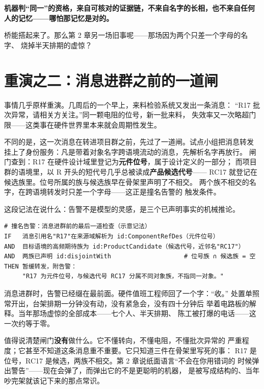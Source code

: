 \textbf{机器判“同一”的资格，来自可核对的证据链，不来自名字的长相，也不来自任何人的记忆——哪怕那记忆是对的。}

桥能搭起来了。那么第 2 章另一场旧事呢——那场因为两个只差一个字母的名字、
烧掉半天排期的虚惊？

\section{重演之二：消息进群之前的一道闸}

事情几乎原样重演。几周后的一个早上，来料检验系统又发出一条消息：
“R17 批次异常，请相关方关注。”同一颗电阻的位号，新一批来料，
失效率又一次略超门限——这类事在硬件世界里本来就会周期性发生。

不同的是，这一次消息在转进项目群之前，先过了一道闸。试点小组把消息转发
挂上了身份服务：凡是带着对象名字跨语境流动的消息，先解析名字再放行。
闸门查到：R17 在硬件设计域里登记为\textbf{元件位号}，属于设计定义的一部分；
而项目群的语境里，以 R 开头的短代号几乎总被读成\textbf{产品候选代号}——
RC17 就登记在候选族里。位号所属的族与候选族早在骨架里声明了不相交。
两个族不相交的名字，在跨语境转发时只差一个字母——这正是撞名告警的
触发条件。

这段记法在说什么：告警不是模型的灵感，是三个已声明事实的机械推论。

\nopagebreak[4]
\begin{codebox}
\begin{Verbatim}[fontsize=\small,breaklines=true,breakanywhere=true,breaksymbolleft={},breaksymbolright={}]
# 撞名告警：消息进群前的最后一道检查（示意记法）
IF   消息引用名"R17"在来源域解析为 id:ComponentRefDes（元件位号）
AND  目标语境的高频期待族为 id:ProductCandidate（候选代号，近邻名"RC17"）
AND  两族已声明 id:disjointWith                    # 位号族 ∩ 候选族 = 空
THEN 暂缓转发，附告警：
     "R17 为元件位号，与候选代号 RC17 分属不同对象族，不指同一对象。"
\end{Verbatim}
\end{codebox}

消息进群时，告警已经缀在最前面。硬件值班工程师回了一个字：“收。”
处置单照常开出，台架排期一分钟没有动，没有紧急会，没有四十分钟后
举着电路板的解释。当年那场虚惊的全部成本——七个人、半天排期、
陈工被打爆的电话——这一次约等于零。

值得说清楚闸门\textbf{没有}做什么。它不懂转向，不懂电阻，不懂批次异常的
严重程度；它甚至不知道这条消息重不重要。它只知道三件在骨架里写死的事：
R17 是位号，RC17 是候选，两族不相交。第 2 章说纸面语言“不会在你用错词的
时候弹出警告”——现在会弹了，而弹出它的不是更聪明的机器，
是被写成结构的、当年吵完架就该记下来的那点常识。

